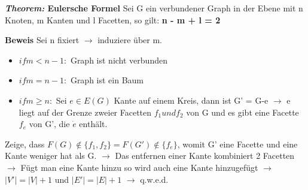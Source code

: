 \textbf{\textit{Theorem:} Eulersche Formel} \newline
Sei G ein verbundener Graph in der Ebene mit n Knoten, m Kanten und l Facetten, so gilt: \textbf{n - m + l = 2} \newline

\textbf{Beweis} \newline
Sei n fixiert $\rightarrow$ induziere über m.
\begin{itemize}
	\item $if m < n -1:$ Graph ist nicht verbunden
	\item $if m = n -1:$ Graph ist ein Baum
	\item $if m \ge n:$ Sei $e \in E(G)$ Kante auf einem Kreis, dann ist G' = G-e $\rightarrow$ e liegt auf der Grenze zweier Facetten $f_1 und f_2$ von G und es gibt eine Facette $f_e$ von G', die $\dot{e}$ enthält. 
\end{itemize}
Zeige, dass $F(G) \notin \{f_1, f_2\} = F(G') \notin \{f_e\}$, womit G' eine Facette und eine Kante weniger hat als G. \newline
$\rightarrow$ Das entfernen einer Kante kombiniert 2 Facetten \newline
$\rightarrow$ Fügt man eine Kante hinzu so wird auch eine Kante hinzugefügt \newline
$\rightarrow$ $|V'|=|V|+1$ und $|E'|=|E|+1$ $\rightarrow$ q.w.e.d. \newline
  
